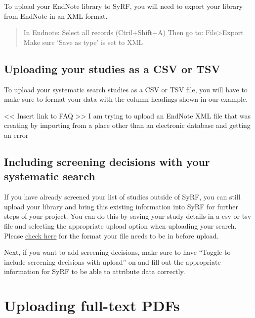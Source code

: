 \documentclass[
]{book}
\begin{document}
To upload your EndNote library to SyRF, you will need to export your library from EndNote in an XML format.

\begin{quote}
In Endnote: Select all records (Ctril+Shift+A)
Then go to: File\textgreater{}Export
Make sure `Save as type' is set to XML
\end{quote}

\hypertarget{uploading-your-studies-as-a-csv-or-tsv}{%
\subsection{Uploading your studies as a CSV or TSV}\label{uploading-your-studies-as-a-csv-or-tsv}}

To upload your systematic search studies as a CSV or TSV file, you will have to make sure to format your data with the column headings shown in our example.

\textless{}\textless{} Insert link to FAQ \textgreater{}\textgreater{}
I am trying to upload an EndNote XML file that was creating by importing from a place other than an electronic database and getting an error

\hypertarget{including-screening-decisions-with-your-systematic-search}{%
\subsection{Including screening decisions with your systematic search}\label{including-screening-decisions-with-your-systematic-search}}

If you have already screened your list of studies outside of SyRF, you can still upload your library and bring this existing information into SyRF for further steps of your project. You can do this by saving your study details in a csv or tsv file and selecting the appropriate upload option when uploading your search. Please \href{https://app.syrf.org.uk/assets/pdfs/Systematic\%20search\%20instructions.pdf}{check here} for the format your file needs to be in before upload.

Next, if you want to add screening decisions, make sure to have ``Toggle to include screening decisions with upload'' on and fill out the appropriate information for SyRF to be able to attribute data correctly.

\hypertarget{uploading-full-text-pdfs}{%
\section{Uploading full-text PDFs}\label{uploading-full-text-pdfs}}
\end{document}
